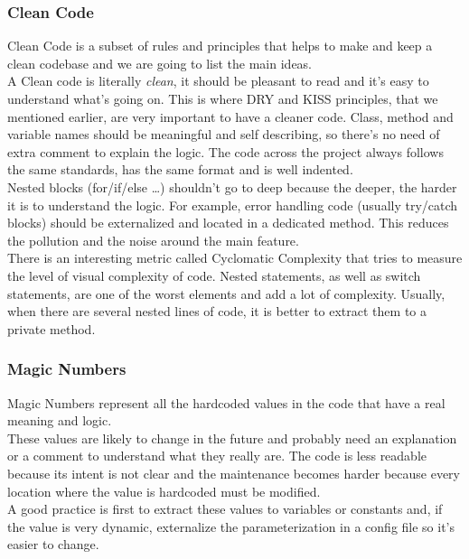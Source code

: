\subsubsection{Clean Code}
Clean Code is a subset of rules and principles that helps to make and
keep a clean codebase and we are going to list the main ideas. \\
\newline
A Clean code is literally \textit{clean}, it should be
pleasant to read and it's easy to understand what's going on.
This is where DRY and KISS principles, that we mentioned earlier,
are very important to have a cleaner code.
Class, method and variable names should be meaningful and self
describing, so there's no need of extra comment to explain the logic.
The code across the project always follows the same standards, has the
same format and is well indented. \\
\newline
Nested blocks (for/if/else \ldots) shouldn't go to deep
because the deeper, the harder it is to understand the logic.
For example, error handling code (usually try/catch blocks) should be
externalized and located in a dedicated method.
This reduces the pollution and the noise around the main feature. \\
There is an interesting metric called Cyclomatic Complexity that tries to
measure the level of visual complexity of code.
Nested statements, as well as switch statements, are one of the worst
elements and add a lot of complexity.
Usually, when there are several nested lines of code, it is better to
extract them to a private method.

\subsubsection{Magic Numbers}
Magic Numbers represent all the hardcoded values in the code that have
a real meaning and logic. \\
\newline
These values are likely to change in the future and probably need an
explanation or a comment to understand what they really are.
The code is less readable because its intent is not clear and the
maintenance becomes harder because every location where the value
is hardcoded must be modified. \\
A good practice is first to extract these values to variables or
constants and, if the value is very dynamic, externalize the
parameterization in a config file so it's easier to change.

